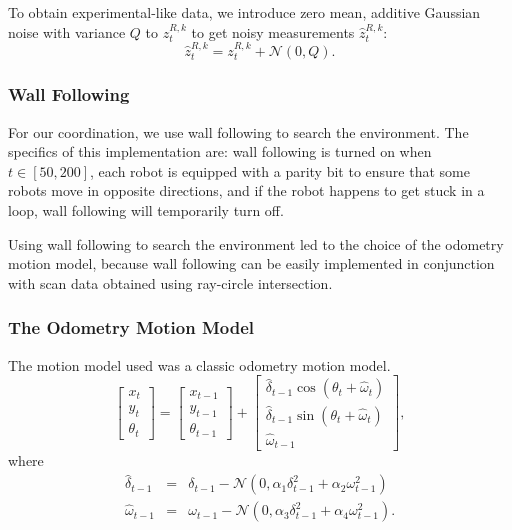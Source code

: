 To obtain experimental-like data, we introduce zero mean, additive Gaussian noise with variance $Q$ to $z_t^{R,k}$ to get noisy measurements $\hat{z}_t^{R,k}$:
\begin{equation}
\hat{z}_t^{R,k}=z_t^{R,k}+\mathcal{N}(0,Q).
\end{equation}

\subsubsection{Wall Following}

For our coordination, we use wall following to search the environment.  The specifics of this implementation are: wall following is turned on when $t\in[50,200]$, each robot is equipped with a parity bit to ensure that some robots move in opposite directions, and if the robot happens to get stuck in a loop, wall following will temporarily turn off.

Using wall following to search the environment led to the choice of the odometry motion model, because wall following can be easily implemented in conjunction with scan data obtained using ray-circle intersection.


\subsubsection{The Odometry Motion Model}

The motion model used was a classic odometry motion model.  
\begin{equation}
\begin{bmatrix}
x_{t}\\
y_{t}\\
\theta_{t}
\end{bmatrix}=\begin{bmatrix}
x_{t-1}\\
y_{t-1}\\
\theta_{t-1}
\end{bmatrix}+\begin{bmatrix}
\hat{\delta}_{t-1}  \cos(\theta_t+\hat{\omega}_t)\\
\hat{\delta}_{t-1}\sin(\theta_t+\hat{\omega}_t)\\
\hat{\omega}_{t-1}
\end{bmatrix},
\label{eq:OdometryMotion}
\end{equation}
where
\begin{eqnarray}
\hat{\delta}_{t-1}&=&\delta_{t-1}-\mathcal{N}(0,\alpha_1\delta_{t-1}^2+\alpha_2\omega_{t-1}^2)\\
\hat{\omega}_{t-1}&=&\omega_{t-1}-\mathcal{N}(0,\alpha_3\delta_{t-1}^2+\alpha_4\omega_{t-1}^2).
\end{eqnarray}


